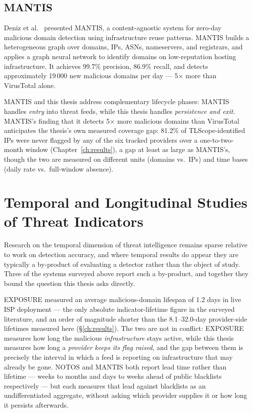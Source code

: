 \documentclass[12pt, a4paper, twoside]{report}
\begin{document}
\subsection{MANTIS}

Deniz et al.\ \cite{deniz2025mantis} presented MANTIS, a content-agnostic system for zero-day
malicious domain detection using infrastructure reuse patterns. MANTIS builds a heterogeneous graph
over domains, IPs, ASNs, nameservers, and registrars, and applies a graph neural network to
identify domains on low-reputation hosting infrastructure. It achieves 99.7\% precision, 86.9\%
recall, and detects approximately 19\,000 new malicious domains per day --- 5$\times$ more than
VirusTotal alone.

MANTIS and this thesis address complementary lifecycle phases: MANTIS handles \emph{entry} into
threat feeds, while this thesis handles \emph{persistence and exit}. MANTIS's finding that it
detects 5$\times$ more malicious domains than VirusTotal anticipates the thesis's own measured
coverage gap: 81.2\% of TLScope-identified IPs were never flagged by any of the six tracked
providers over a one-to-two-month window (Chapter~\ref{ch:results}), a gap at least as large as
MANTIS's, though the two are measured on different units (domains vs.\ IPs) and time bases (daily
rate vs.\ full-window absence).

\section{Temporal and Longitudinal Studies of Threat Indicators}
\label{sec:rw_temporal}

Research on the temporal dimension of threat intelligence remains sparse relative to work on
detection accuracy, and where temporal results do appear they are typically a by-product of
evaluating a detector rather than the object of study. Three of the systems surveyed above report
such a by-product, and together they bound the question this thesis asks directly.

EXPOSURE \cite{bilge2011exposure} measured an average malicious-domain lifespan of 1.2 days in live
ISP deployment --- the only absolute indicator-lifetime figure in the surveyed literature, and an
order of magnitude shorter than the 8.1--32.0-day provider-side lifetimes measured here
(\S\ref{ch:results}). The two are not in conflict: EXPOSURE measures how long the malicious
\emph{infrastructure} stays active, while this thesis measures how long a \emph{provider keeps its
flag raised}, and the gap between them is precisely the interval in which a feed is reporting on
infrastructure that may already be gone. NOTOS \cite{antonakakis2010notos} and MANTIS
\cite{deniz2025mantis} both report lead time rather than lifetime --- weeks to months and days to
weeks ahead of public blacklists respectively --- but each measures that lead against blacklists as
an undifferentiated aggregate, without asking which provider supplies it or how long it persists
afterwards.
\end{document}
